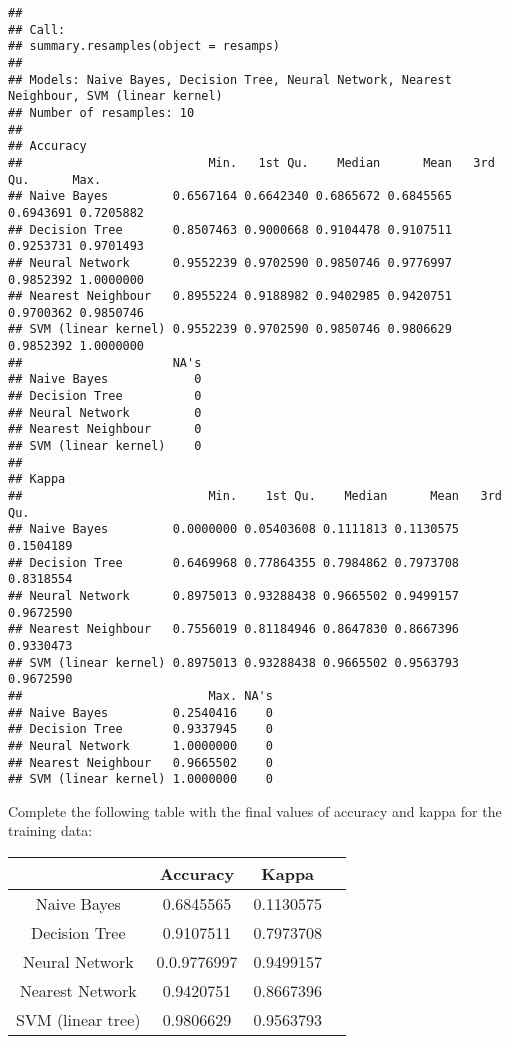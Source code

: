\documentclass[]{article}
\begin{document}
\begin{verbatim}
## 
## Call:
## summary.resamples(object = resamps)
## 
## Models: Naive Bayes, Decision Tree, Neural Network, Nearest Neighbour, SVM (linear kernel) 
## Number of resamples: 10 
## 
## Accuracy 
##                          Min.   1st Qu.    Median      Mean   3rd Qu.      Max.
## Naive Bayes         0.6567164 0.6642340 0.6865672 0.6845565 0.6943691 0.7205882
## Decision Tree       0.8507463 0.9000668 0.9104478 0.9107511 0.9253731 0.9701493
## Neural Network      0.9552239 0.9702590 0.9850746 0.9776997 0.9852392 1.0000000
## Nearest Neighbour   0.8955224 0.9188982 0.9402985 0.9420751 0.9700362 0.9850746
## SVM (linear kernel) 0.9552239 0.9702590 0.9850746 0.9806629 0.9852392 1.0000000
##                     NA's
## Naive Bayes            0
## Decision Tree          0
## Neural Network         0
## Nearest Neighbour      0
## SVM (linear kernel)    0
## 
## Kappa 
##                          Min.    1st Qu.    Median      Mean   3rd Qu.
## Naive Bayes         0.0000000 0.05403608 0.1111813 0.1130575 0.1504189
## Decision Tree       0.6469968 0.77864355 0.7984862 0.7973708 0.8318554
## Neural Network      0.8975013 0.93288438 0.9665502 0.9499157 0.9672590
## Nearest Neighbour   0.7556019 0.81184946 0.8647830 0.8667396 0.9330473
## SVM (linear kernel) 0.8975013 0.93288438 0.9665502 0.9563793 0.9672590
##                          Max. NA's
## Naive Bayes         0.2540416    0
## Decision Tree       0.9337945    0
## Neural Network      1.0000000    0
## Nearest Neighbour   0.9665502    0
## SVM (linear kernel) 1.0000000    0
\end{verbatim}

Complete the following table with the final values of accuracy and kappa
for the training data:

\begin{center}
	\begin{tabular}{ |c|c|c|c| } 
		\hline
		& Accuracy & Kappa \\
		\hline
		Naive Bayes & 0.6845565 & 0.1130575 \\ 
		Decision Tree & 0.9107511 & 0.7973708 \\ 
		Neural Network & 0.0.9776997 & 0.9499157 \\
		Nearest Network & 0.9420751 & 0.8667396 \\
		SVM (linear tree) & 0.9806629 & 0.9563793 \\
		\hline
	\end{tabular}
\end{center}
\end{document}
